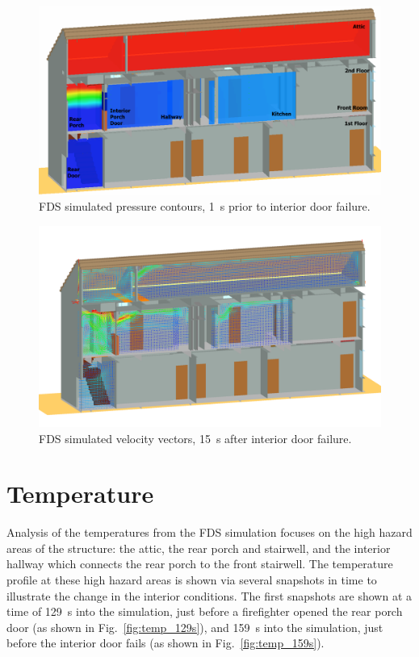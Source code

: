 \documentclass[12pt,oneside]{book}
\begin{document}
\begin{figure}[!ht]
\includegraphics[width=.75\textwidth]{../Figures/west_50th_baseline_pres2}

\caption[FDS simulated pressure contours, 1~s prior to interior door failure.]{FDS simulated pressure contours, 1~s prior to interior door failure.}
\label{fig:pres_159s}
\end{figure}

\newpage
\begin{landscape}
\centering
\begin{figure}[!ht]
\includegraphics[width=1.1\textwidth]{../Figures/west_50th_baseline_velo_175}


\caption{FDS simulated velocity vectors, 15~s after interior door failure.}
\label{fig:velo_175s}
\end{figure}
\end{landscape}
\newpage

\section{Temperature}
\label{temp}
Analysis of the temperatures from the FDS simulation focuses on the high hazard areas of the structure: the attic, the rear porch and stairwell, and the interior hallway which connects the rear porch to the front stairwell. The temperature profile at these high hazard areas is shown via several snapshots in time to illustrate the change in the interior conditions. The first snapshots are shown at a time of 129~s into the simulation, just before a firefighter opened the rear porch door (as shown in Fig.~\ref{fig:temp_129s}), and 159~s into the simulation, just before the interior door fails (as shown in Fig.~\ref{fig:temp_159s}).
\end{document}

